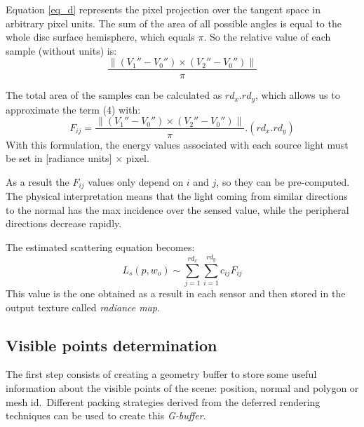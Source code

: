 \documentclass[10pt, conference]{IEEEtran}
\begin{document}
Equation \ref{eq_d} represents the pixel projection over the tangent space in arbitrary pixel units. The sum of the area of all possible angles is equal to the whole disc surface hemisphere, which equals $\pi$. So the relative value of each sample (without units) is:\
\[ 
	\frac{ \left\|{ (V_1'' - V_0'') \times (V_2'' - V_0'') }\right\| }{\pi}
\]

The total area of the samples can be calculated as $rd_x . rd_y$, which allows us to approximate the term (4) with:\
\[ 
	F_{ij} =  \frac{ \left\|{ (V_1'' - V_0'') \times (V_2'' - V_0'') }\right\| }{\pi} . (rd_x . rd_y)
\]
With this formulation, the energy values associated with each source light must be set in [radiance units] $\times$ pixel.\

As a result the $F_{ij}$ values only depend on $i$ and $j$, so they can be pre-computed. The physical interpretation means that the light 
coming from similar directions to the normal has the max incidence over the sensed value, while the peripheral directions decrease rapidly.\

The estimated scattering equation becomes:\
\[
	L_s(p, w_o) \sim \sum_{j=1}^{rd_x} \sum_{i=1}^{rd_y} c_{ij} F_{ij}
\]
This value is the one obtained as a result in each sensor and then stored in the output texture called \emph{radiance map}.

\subsection{Visible points determination}
The first step consists of creating a geometry buffer to store some useful information about the visible points of the scene: position, normal and polygon or mesh id.\
Different packing strategies derived from the deferred rendering techniques \cite{deferred_rendering} can be used to create this \emph{G-buffer}. 

\end{document}
